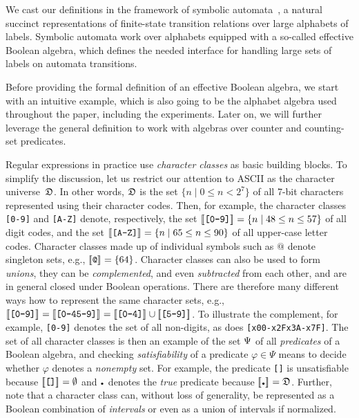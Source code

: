 \documentclass[acmsmall,screen]{acmart}
\begin{document}
We cast our definitions in the framework of symbolic automata~\cite{DV20},
a natural succinct representations of finite-state transition relations over
large alphabets of labels.
Symbolic automata work over alphabets equipped with a so-called effective
Boolean algebra, which defines the needed interface for handling large sets of
labels on automata transitions.

Before providing the formal definition of an effective Boolean
algebra, we start with an intuitive example, which is also going to
be the alphabet algebra used throughout the paper, including the
experiments. Later on, we will further leverage the general definition
to work with algebras over counter and counting-set predicates.
\begin{ex}
  Regular expressions in practice use \emph{character classes} as
  basic building blocks.  To simplify the discussion, let us restrict
  our attention to ASCII as the character universe~$\mathfrak{D}$.
  In other
  words, $\mathfrak{D}$ is the set $\{n\mid 0\leq n
  < 2^7\}$ of all 7-bit characters represented using their character codes.
  Then, for example,
  the character classes \texttt{[0-9]} and \texttt{[A-Z]} denote,
  respectively, the set $[\![\texttt{[0-9]}]\!]_{{}}=\{n\mid 48\leq n\leq
  57\}$ of all digit codes, and the set $[\![\texttt{[A-Z]}]\!]_{{}}=\{n\mid
  65\leq n\leq 90\}$ of all upper-case letter codes.  Character
  classes made up of individual symbols such as $\texttt{@}$ denote
  singleton sets, e.g., $[\![\texttt{@}]\!]_{{}}=\{64\}$.  Character classes
  can also be used to form \emph{unions}, they can be \emph{complemented}, and even
  \emph{subtracted} from each other, and are in general closed under
  Boolean operations.  There are therefore many different ways how to
  represent the same character sets, e.g.,
  $\den{\texttt{[0-9]}}=\den{\texttt{[0-45-9]}}=\den{\texttt{[0-4]}}\cup\den{\texttt{[5-9]}}$.
  To illustrate the complement, for example, \texttt{[{\caret}0-9]} denotes
  the set of all non-digits, as does
  \texttt{[{\bslash}x00-{\bslash}x2F{\bslash}x3A-{\bslash}x7F]}.
  The set of all character classes is then an example of the set $\Psi$ of
  all \emph{predicates} of a Boolean algebra, and checking \emph{satisfiability} of a
  predicate $\varphi\in\Psi$ means to decide whether $\varphi$ denotes a
  \emph{nonempty} set.
  For example, the predicate \texttt{[]} is
  unsatisfiable because $[\![\texttt{[]}]\!]_{{}} = \emptyset$ and
  $\DOT$ denotes the \emph{true} predicate because $\den{\DOT}=\DOM$.
  Further, note
  that a character class can, without loss of generality, be represented as a
  Boolean combination of \emph{intervals} or even as a union of
  intervals if normalized.
\end{ex}
\end{document}
